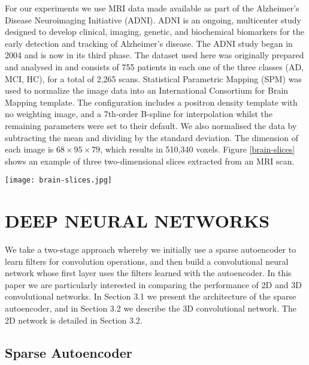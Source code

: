 \documentclass[a4paper,10pt]{article}
\begin{document}
\noindent For our experiments we use MRI data made available as part of the Alzheimer's Disease Neuroimaging Initiative (ADNI). ADNI is an ongoing, multicenter study designed to develop clinical, imaging, genetic, and biochemical biomarkers for the early detection and tracking of Alzheimer's disease. The ADNI study began in 2004 and is now in its third phase. The dataset used here was originally prepared and analysed in \cite{gupta} and consists of 755 patients in each one of the three classes (AD, MCI, HC), for a total of 2,265 scans. Statistical Parametric Mapping (SPM) was used to normalize the image data into an International Consortium for Brain Mapping template. The configuration includes a positron density template with no weighting image, and a 7th-order B-spline for interpolation whilst the remaining parameters were set to their default. We also normalised the data by subtracting the mean and dividing by the standard deviation. The dimension of each image is $68 \times 95 \times 79$, which results in 510,340 voxels. Figure \ref{brain-slices} shows an example of three two-dimensional slices extracted from an MRI scan.
\begin{figure*}
\centering
\texttt{[image: brain-slices.jpg]}
\caption{Slices of an MRI scan of an AD patient, from left to right: in axial view, coronal view and sagittal view.}
\label{brain-slices}
\end{figure*}

\section{\uppercase{Deep Neural Networks}}
\label{sec:methods}

\noindent We take a two-stage approach whereby we initially use a sparse autoencoder to learn filters for convolution operations, and then build a convolutional neural network whose first layer uses the filters learned with the autoencoder. In this paper we are particularly interested in comparing the performance of 2D and 3D convolutional networks. In Section 3.1 we present the architecture of the sparse autoencoder, and in Section 3.2 we describe the 3D convolutional network. The 2D network is detailed in Section 3.2. 

\subsection{Sparse Autoencoder}
\end{document}

